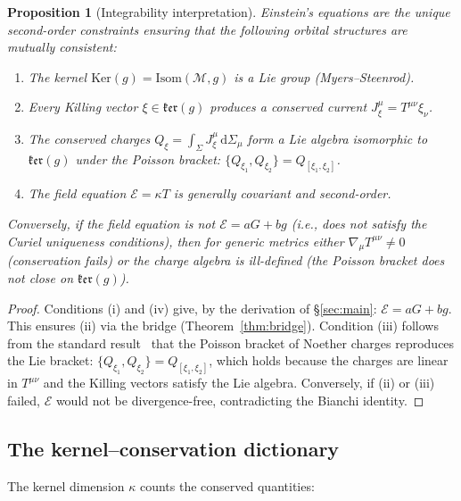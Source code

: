 \documentclass[12pt]{article}
\theoremstyle{plain}
\newtheorem{proposition}[theorem]{Proposition}
\theoremstyle{definition}
\theoremstyle{remark}
\newcommand{\Ker}{\mathrm{Ker}}
\newcommand{\Isom}{\mathrm{Isom}}
\newcommand{\dd}{\mathrm{d}}
\begin{document}
\begin{proposition}[Integrability interpretation]\label{thm:integrability}
Einstein's equations are the unique second-order constraints ensuring that the following orbital structures are mutually consistent:
\begin{enumerate}[label=(\roman*)]
    \item The kernel $\Ker(g) = \Isom(\mathcal{M}, g)$ is a Lie group (Myers--Steenrod).
    \item Every Killing vector $\xi \in \mathfrak{ker}(g)$ produces a conserved current $J^\mu_\xi = T^{\mu\nu}\xi_\nu$.
    \item The conserved charges $Q_\xi = \int_\Sigma J^\mu_\xi\,\dd\Sigma_\mu$ form a Lie algebra isomorphic to $\mathfrak{ker}(g)$ under the Poisson bracket: $\{Q_{\xi_1}, Q_{\xi_2}\} = Q_{[\xi_1,\xi_2]}$.
    \item The field equation $\mathcal{E} = \kappa T$ is generally covariant and second-order.
\end{enumerate}
Conversely, if the field equation is not $\mathcal{E} = aG + bg$ (i.e., does not satisfy the Curiel uniqueness conditions), then for generic metrics either $\nabla_\mu T^{\mu\nu} \neq 0$ (conservation fails) or the charge algebra is ill-defined (the Poisson bracket does not close on $\mathfrak{ker}(g)$).
\end{proposition}

\begin{proof}
Conditions (i) and (iv) give, by the derivation of \S\ref{sec:main}: $\mathcal{E} = aG + bg$. This ensures (ii) via the bridge (Theorem~\ref{thm:bridge}). Condition (iii) follows from the standard result~\cite{wald1984} that the Poisson bracket of Noether charges reproduces the Lie bracket: $\{Q_{\xi_1}, Q_{\xi_2}\} = Q_{[\xi_1,\xi_2]}$, which holds because the charges are linear in $T^{\mu\nu}$ and the Killing vectors satisfy the Lie algebra. Conversely, if (ii) or (iii) failed, $\mathcal{E}$ would not be divergence-free, contradicting the Bianchi identity.
\end{proof}

\subsection{The kernel--conservation dictionary}

The kernel dimension $\kappa$ counts the conserved quantities:
\end{document}
